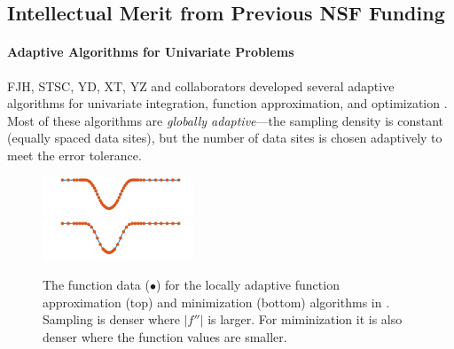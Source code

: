 \documentclass[11pt]{NSFamsart}
\def\abs#1{\ensuremath{\left \lvert #1 \right \rvert}}
\begin{document}
\subsection{Intellectual Merit from Previous NSF Funding}
\label{previousmeritsubsec}

\paragraph*{Adaptive Algorithms for Univariate Problems} \label{sec:localadpat}
FJH, STSC, YD, XT, YZ and collaborators developed several adaptive algorithms for univariate integration, function approximation, and optimization \cite{ChoEtal17a,HicEtal14b,  Din15a, Ton14a, Zha18a}.  Most of these algorithms are \emph{globally adaptive}---the sampling density is constant (equally spaced data sites), but the number of data sites is chosen adaptively to meet the error tolerance.

\begin{figure}
	\centering
	\vspace{-1ex}
	\includegraphics[width = 0.4\textwidth]{ProgramsImages/sampling-funappxg.png}
	\\
	\includegraphics[width = 0.4\textwidth]{ProgramsImages/sampling-funming.png}

	\vspace{-2ex}
	\caption{The function data ({\color{MATLABOrange}$\bullet$}) for the locally adaptive 
	function approximation (top) and minimization (bottom) algorithms in \cite{ChoEtal17a}.  Sampling is denser where $\abs{f''}$ is larger.  For miminization it is also denser where the function values are smaller. \label{localadaptfig}}
\end{figure}
\end{document}
